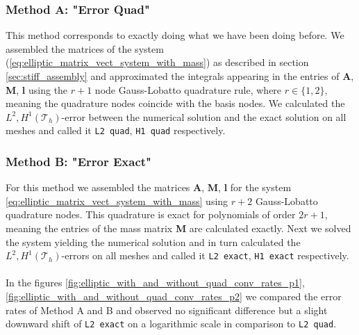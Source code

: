 \subsubsection*{Method A: "Error Quad"}
This method corresponds to exactly doing what we have been doing before. We assembled the matrices of the system (\ref{eq:elliptic_matrix_vect_system_with_mass})
as described in section \ref{sec:stiff_assembly} and approximated the integrals appearing in the entries of \textbf{A}, \textbf{M}, \textbf{l} 
using the $r+1$ node Gauss-Lobatto quadrature rule, where $r \in \{1,2\}$, meaning the quadrature nodes coincide with the basis nodes.
We calculated the $L^2, H^1(\mathcal{T}_h)$-error between the numerical solution and the exact solution on all meshes and called it \texttt{L2 quad}, \texttt{H1 quad}
respectively.

\subsubsection*{Method B: "Error Exact"}
For this method we assembled the matrices \textbf{A}, \textbf{M}, \textbf{l} for the system 
\ref{eq:elliptic_matrix_vect_system_with_mass} using $r+2$ Gauss-Lobatto quadrature nodes. This quadrature is exact for polynomials of order $2r+1$,
meaning the entries of the mass matrix \textbf{M} are calculated exactly. Next we solved the system yielding the numerical solution and in turn
calculated the $L^2, H^1(\mathcal{T}_h)$-errors on all meshes and called it \texttt{L2 exact}, \texttt{H1 exact}
respectively. 
\\ \\
In the figures \ref{fig:elliptic_with_and_without_quad_conv_rates_p1}, \ref{fig:elliptic_with_and_without_quad_conv_rates_p2} we compared 
the error rates of Method A and B and observed no significant difference but a slight downward shift of \texttt{L2 exact} on a logarithmic scale 
in comparison to \texttt{L2 quad}.